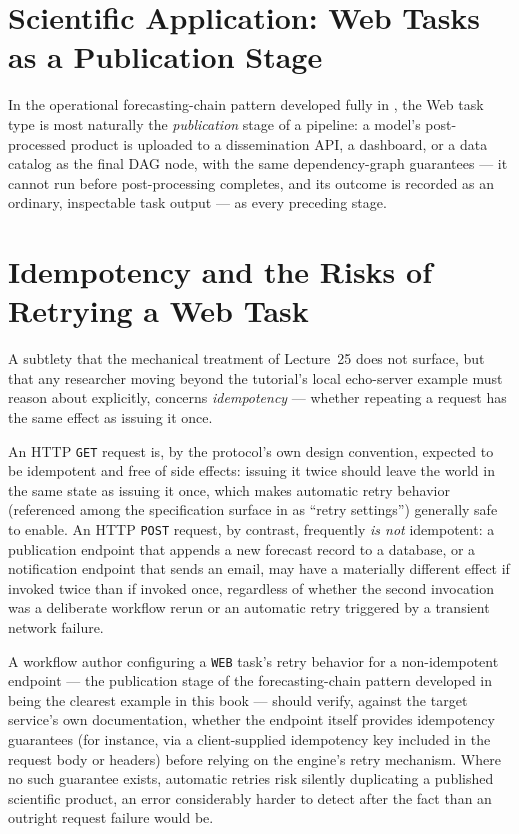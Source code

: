 \section{Scientific Application: Web Tasks as a Publication Stage}

In the operational forecasting-chain pattern developed fully in
, the Web task type is most naturally the
\emph{publication} stage of a pipeline: a model's post-processed product is
uploaded to a dissemination API, a dashboard, or a data catalog as the final
DAG node, with the same dependency-graph guarantees --- it cannot run before
post-processing completes, and its outcome is recorded as an ordinary,
inspectable task output --- as every preceding stage.

\section{Idempotency and the Risks of Retrying a Web Task}

A subtlety that the mechanical treatment of Lecture~25 does not surface, but
that any researcher moving beyond the tutorial's local echo-server example
must reason about explicitly, concerns \emph{idempotency} --- whether
repeating a request has the same effect as issuing it once.

An HTTP \texttt{GET} request is, by the protocol's own design convention,
expected to be idempotent and free of side effects: issuing it twice should
leave the world in the same state as issuing it once, which makes automatic
retry behavior (referenced among the specification surface in
 as ``retry settings'') generally safe to enable. An
HTTP \texttt{POST} request, by contrast, frequently \emph{is not}
idempotent: a publication endpoint that appends a new forecast record to a
database, or a notification endpoint that sends an email, may have a
materially different effect if invoked twice than if invoked once,
regardless of whether the second invocation was a deliberate workflow
rerun or an automatic retry triggered by a transient network failure.

\begin{cautionbox}
A workflow author configuring a \texttt{WEB} task's retry behavior for a
non-idempotent endpoint --- the publication stage of the forecasting-chain
pattern developed in  being the clearest example in this
book --- should verify, against the target service's own documentation,
whether the endpoint itself provides idempotency guarantees (for instance,
via a client-supplied idempotency key included in the request body or
headers) before relying on the engine's retry mechanism. Where no such
guarantee exists, automatic retries risk silently duplicating a published
scientific product, an error considerably harder to detect after the fact
than an outright request failure would be.
\end{cautionbox}

